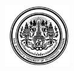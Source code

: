 \documentclass[12pt,oneside,openright,a4paper]{cpe-english-project}
\begin{document}
\pdfstringdefDisableCommands{%
\let\MakeUppercase\relax
}
\begin{center}
  \includegraphics[width=2.8cm]{Image/KMUTT_Logo.png}
\end{center}
\vspace*{-1cm}


\maketitlepage 
\makesignaturepage 

\tableofcontents                    
\listoftables
\listoffigures                      
\end{document}
